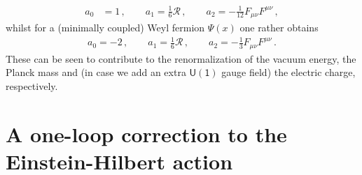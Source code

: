 %
\begin{align} \label{eq:dewittcoeffscalar}
	 a_0 &= 1\, , \qquad a_1 = \frac{1}{6} \mathcal{R}\, , \qquad a_2=-\frac{1}{12} F_{\mu \nu} F^{\mu \nu}\, ,
\end{align}
%
whilst for a (minimally coupled) Weyl fermion $\Psi(x)$ one rather obtains \cite{Bastianelli:2008cu}
%
\begin{align} \label{eq:dewittcoefffermion}
	a_0 = -2\, , \qquad a_1 = \frac{1}{6} \mathcal{R}\, , \qquad  a_2=-\frac{1}{3} F_{\mu \nu} F^{\mu \nu}\, .
\end{align}
%
These can be seen to contribute to the renormalization of the vacuum energy, the Planck mass and (in case we add an extra $\mathsf{U(1)}$ gauge field) the electric charge, respectively. 

\section{A one-loop correction to the Einstein-Hilbert action}
\label{s:oneloopEH}

